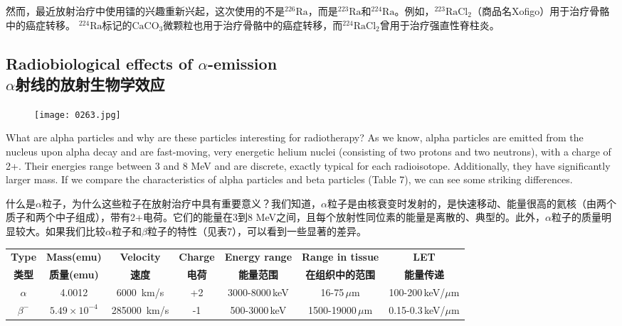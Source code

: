 \documentclass[dvipsnames, svgnames,a4paper,11pt]{article}
\begin{document}
然而，最近放射治疗中使用镭的兴趣重新兴起，这次使用的不是\(\mathrm{^{226}Ra}\)，而是\(\mathrm{^{223}Ra}\)和\(\mathrm{^{224}Ra}\)。例如，\(\mathrm{^{223}RaCl_2}\)（商品名Xofigo）用于治疗骨骼中的癌症转移。 \(\mathrm{^{224}Ra}\)标记的\(\mathrm{CaCO_3}\)微颗粒也用于治疗骨骼中的癌症转移，而\(\mathrm{^{224}RaCl_2}\)曾用于治疗强直性脊柱炎。

\subsection{Radiobiological effects of \(\alpha\)-emission \\ \(\alpha\)射线的放射生物学效应}  

\begin{wrapfigure}{r}{0.35\textwidth}
	\centering
    \texttt{[image: 0263.jpg]}  
     \label{fig353}
\end{wrapfigure}

What are alpha particles and why are these particles interesting for radiotherapy? As we know, alpha particles are emitted from the nucleus upon alpha decay and are fast-moving, very energetic helium nuclei (consisting of two protons and two neutrons), with a charge of 2+. Their energies range between 3 and 8 MeV and are discrete, exactly typical for each radioisotope. Additionally, they have significantly larger mass. If we compare the characteristics of alpha particles and beta particles (Table 7), we can see some striking differences.  

什么是$\alpha$粒子，为什么这些粒子在放射治疗中具有重要意义？我们知道，$\alpha$粒子是由核衰变时发射的，是快速移动、能量很高的氦核（由两个质子和两个中子组成），带有2+电荷。它们的能量在3到8 MeV之间，且每个放射性同位素的能量是离散的、典型的。此外，$\alpha$粒子的质量明显较大。如果我们比较$\alpha$粒子和$\beta$粒子的特性（见表7），可以看到一些显著的差异。  

\begin{table}[h]
      \centering
      \label{table7}
      \begin{tabular}{ccccccc}
      \toprule
      \textbf{Type} & \textbf{Mass(emu)} & \textbf{Velocity } & \textbf{Charge} & \textbf{Energy range } & \textbf{Range in tissue } & \textbf{LET} \\
      \textbf{类型} & \textbf{质量(emu)} & \textbf{速度} & \textbf{电荷} & \textbf{能量范围} & \textbf{在组织中的范围} & \textbf{能量传递} \\
      \midrule
  
       \(\alpha\) & 4.0012 & 6000 \,km/s & +2 & 3000-8000\,keV & 16-75\,$\mu$m & 100-200\,keV/$\mu$m \\
  
       \(\beta^-\) & $5.49\times 10^{-4}$& 285000 \,km/s & -1 & 500-3000\,keV & 1500-19000\,$\mu$m & 0.15-0.3\,keV/$\mu$m \\
      \bottomrule
      \end{tabular}
      \end{table}
\end{document}
